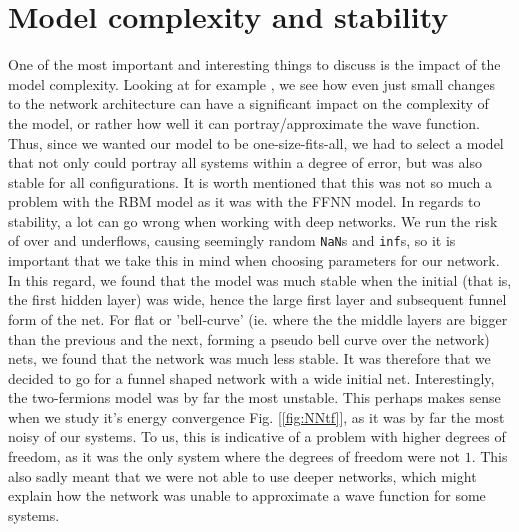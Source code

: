 \documentclass[12pt]{article}
\begin{document}
{\section{Model complexity and stability}
One of the most important and interesting things to discuss is the impact of the model complexity. Looking at for example \cite{symm}, we see how even just small changes to the network architecture can have a significant impact on the complexity of the model, or rather how well it can portray/approximate the wave function. \newline Thus, since we wanted our model to be one-size-fits-all, we had to select a model that not only could portray all systems within a degree of error, but was also stable for all configurations. It is worth mentioned that this was not so much a problem with the RBM model as it was with the FFNN model. \newline
In regards to stability, a lot can go wrong when working with deep networks. We run the risk of over and underflows, causing seemingly random \texttt{NaN}s and \texttt{inf}s, so it is important that we take this in mind when choosing parameters for our network. In this regard, we found that the model was much stable when the initial (that is, the first hidden layer) was wide, hence the large first layer and subsequent funnel form of the net. For flat or 'bell-curve' (ie. where the the middle layers are bigger than the previous and the next, forming a pseudo bell curve over the network) nets, we found that the network was much less stable. It was therefore that we decided to go for a funnel shaped network with a wide initial net.
\newline
Interestingly, the two-fermions model was by far the most unstable. This perhaps makes sense when we study it's energy convergence Fig. [\ref{fig:NNtf}], as it was by far the most noisy of our systems. To us, this is indicative of a problem with higher degrees of freedom, as it was the only system where the degrees of freedom were not $1$. This also sadly meant that we were not able to use deeper networks, which might explain how the network was unable to approximate a wave function for some systems.
}
\end{document}
